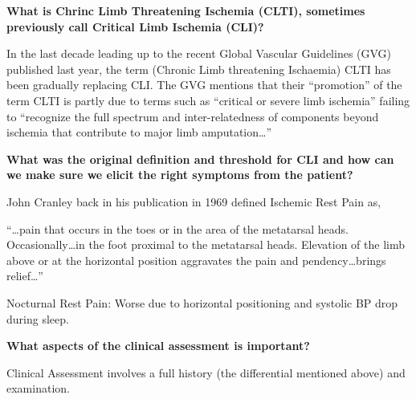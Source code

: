 \documentclass[
]{book}
\begin{document}
\textbf{What is Chrinc Limb Threatening Ischemia (CLTI), sometimes previously
call Critical Limb Ischemia (CLI)?}

In the last decade leading up to the recent Global Vascular Guidelines
(GVG) published last year, the term (Chronic Limb threatening Ischaemia)
CLTI has been gradually replacing CLI. The GVG mentions that their
``promotion'' of the term CLTI is partly due to terms such as ``critical or
severe limb ischemia'' failing to ``recognize the full spectrum and
inter-relatedness of components beyond ischemia that contribute to major
limb amputation\ldots{}''

\textbf{What was the original definition and threshold for CLI and how can we
make sure we elicit the right symptoms from the patient?}

John Cranley back in his publication in 1969 defined Ischemic Rest Pain
as,

``\ldots pain that occurs in the toes or in the area of the metatarsal heads.
Occasionally\ldots in the foot proximal to the metatarsal heads. Elevation
of the limb above or at the horizontal position aggravates the pain and
pendency\ldots brings relief\ldots{}'' \citep{cranleyIschemicRestPain1969}

Nocturnal Rest Pain: Worse due to horizontal positioning and systolic BP
drop during sleep.

\textbf{What aspects of the clinical assessment is important?}

Clinical Assessment involves a full history (the differential mentioned
above) and examination.
\end{document}
